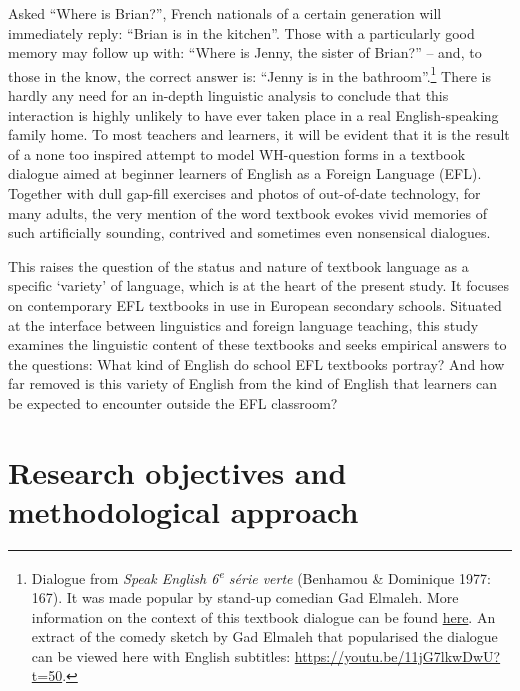 \documentclass[
  letterpaper,
  DIV=11,
  numbers=noendperiod]{scrreprt}
\begin{document}
Asked ``Where is Brian?'', French nationals of a certain generation will
immediately reply: ``Brian is in the kitchen''. Those with a
particularly good memory may follow up with: ``Where is Jenny, the
sister of Brian?'' -- and, to those in the know, the correct answer is:
``Jenny is in the bathroom''.\footnote{Dialogue from \emph{Speak English
  6\textsuperscript{e} série verte} (Benhamou \& Dominique 1977: 167).
  It was made popular by stand-up comedian Gad Elmaleh. More information
  on the context of this textbook dialogue can be found
  \href{https://fr.wikipedia.org/wiki/Where_is_Brian\%3F}{here}. An
  extract of the comedy sketch by Gad Elmaleh that popularised the
  dialogue can be viewed here with English subtitles:
  \url{https://youtu.be/11jG7lkwDwU?t=50}.} There is hardly any need for
an in-depth linguistic analysis to conclude that this interaction is
highly unlikely to have ever taken place in a real English-speaking
family home. To most teachers and learners, it will be evident that it
is the result of a none too inspired attempt to model WH-question forms
in a textbook dialogue aimed at beginner learners of English as a
Foreign Language (EFL). Together with dull gap-fill exercises and photos
of out-of-date technology, for many adults, the very mention of the word
textbook evokes vivid memories of such artificially sounding, contrived
and sometimes even nonsensical dialogues.

This raises the question of the status and nature of textbook language
as a specific `variety' of language, which is at the heart of the
present study. It focuses on contemporary EFL textbooks in use in
European secondary schools. Situated at the interface between
linguistics and foreign language teaching, this study examines the
linguistic content of these textbooks and seeks empirical answers to the
questions: What kind of English do school EFL textbooks portray? And how
far removed is this variety of English from the kind of English that
learners can be expected to encounter outside the EFL classroom?

\section{Research objectives and methodological
approach}\label{research-objectives-and-methodological-approach}
\end{document}
